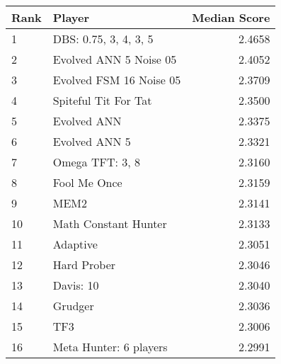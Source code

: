 \begin{tabular}{llr}
\toprule
Rank & Player &  Median Score \\
\midrule
1 & DBS: 0.75, 3, 4, 3, 5 &   2.4658 \\
2 & Evolved ANN 5 Noise 05 &  2.4052\\
3 & Evolved FSM 16 Noise 05 & 2.3709\\
4 & Spiteful Tit For Tat &    2.3500\\
5 & Evolved ANN &             2.3375\\
6 & Evolved ANN 5 &           2.3321\\
7 & Omega TFT: 3, 8 &         2.3160\\
8 & Fool Me Once &            2.3159\\
9 & MEM2 &                    2.3141\\
10 & Math Constant Hunter &   2.3133\\
11 & Adaptive &               2.3051\\
12 & Hard Prober &            2.3046\\
13 & Davis: 10 &              2.3040\\
14 & Grudger &                2.3036\\
15 & TF3 &                    2.3006\\
16 & Meta Hunter: 6 players & 2.2991\\
\bottomrule
\end{tabular}

